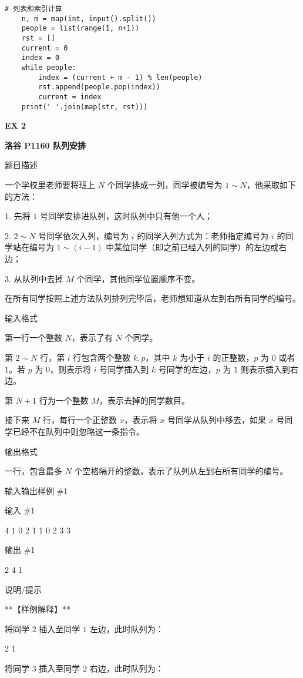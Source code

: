 \documentclass[../main]{subfiles}
\begin{document}
\newpage
\begin{lstlisting}[style = Python]
    # 列表和索引计算
    n, m = map(int, input().split())
    people = list(range(1, n+1))
    rst = []
    current = 0
    index = 0
    while people:
        index = (current + m - 1) % len(people)
        rst.append(people.pop(index))
        current = index
    print(' '.join(map(str, rst)))
\end{lstlisting}

\textbf{EX 2}


\textbf{洛谷 P1160 队列安排}

题目描述

一个学校里老师要将班上 $N$ 个同学排成一列，同学被编号为 $1\sim N$，他采取如下的方法：

1. 先将 $1$ 号同学安排进队列，这时队列中只有他一个人；

2. $2\sim N$ 号同学依次入列，编号为 $i$ 的同学入列方式为：老师指定编号为 $i$ 的同学站在编号为 $1\sim(i-1)$ 中某位同学（即之前已经入列的同学）的左边或右边；

3. 从队列中去掉 $M$ 个同学，其他同学位置顺序不变。

在所有同学按照上述方法队列排列完毕后，老师想知道从左到右所有同学的编号。

输入格式

第一行一个整数 $N$，表示了有 $N$ 个同学。

第 $2\sim N$ 行，第 $i$ 行包含两个整数 $k,p$，其中 $k$ 为小于 $i$ 的正整数，$p$ 为 $0$ 或者 $1$。若 $p$ 为 $0$，则表示将 $i$ 号同学插入到 $k$ 号同学的左边，$p$ 为 $1$ 则表示插入到右边。

第 $N+1$ 行为一个整数 $M$，表示去掉的同学数目。

接下来 $M$ 行，每行一个正整数 $x$，表示将 $x$ 号同学从队列中移去，如果 $x$ 号同学已经不在队列中则忽略这一条指令。

输出格式

一行，包含最多 $N$ 个空格隔开的整数，表示了队列从左到右所有同学的编号。

输入输出样例 \#1

输入 \#1

4
1 0
2 1
1 0
2
3
3

输出 \#1

2 4 1

说明/提示

**【样例解释】**

将同学 $2$ 插入至同学 $1$ 左边，此时队列为：

2 1

将同学 $3$ 插入至同学 $2$ 右边，此时队列为：
\end{document}
